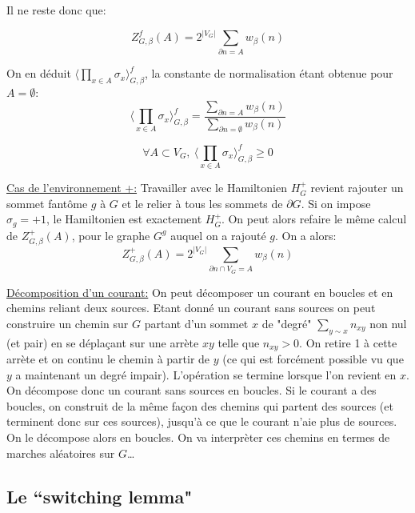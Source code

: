 \documentclass[a4paper,12pt]{report}
\begin{document}
Il ne reste donc que:
\begin{prop}
$$
Z_{G,\beta}^f(A) = 2^{\vert V_G \vert} \sum_{\partial n  = A} w_{\beta}(n)
$$
\end{prop}

On en déduit $\langle \prod_{x \in A} \sigma_x \rangle_{G,\beta}^f$, la constante de normalisation étant obtenue pour $A = \emptyset$:
$$
\langle \prod_{x \in A} \sigma_x \rangle_{G,\beta}^f = \frac{\sum_{\partial n = A} w_{\beta}(n)}{\sum_{\partial n = \emptyset} w_{\beta}(n)}
$$

\begin{prop}
$$
\forall A \subset V_G, \ \langle \prod_{x \in A} \sigma_x \rangle_{G,\beta}^f \geq 0
$$
\end{prop}

\underline{Cas de l'environnement +:}
Travailler avec le Hamiltonien $H_{G}^+$ revient rajouter un sommet fantôme $g$ à $G$ et le relier à tous les sommets de $\partial G$. Si on impose $\sigma_g = +1$, le Hamiltonien est exactement $H_{G}^+$. On peut alors refaire le même calcul de $Z_{G,\beta}^+(A)$, pour le graphe $G^g$ auquel on a rajouté $g$. On a alors:
$$
Z_{G,\beta}^+(A) = 2^{\vert V_G \vert} \sum_{\partial n \cap V_G  = A} w_{\beta}(n)
$$

\underline{Décomposition d'un courant:} On peut décomposer un courant en boucles et en chemins reliant deux sources. Etant donné un courant sans sources on peut construire un chemin sur $G$ partant d'un sommet $x$ de "degré" $\sum_{y \sim x} n_{xy}$ non nul (et pair) en se déplaçant sur une arrète $xy$ telle que $n_{xy}>0$. On retire 1 à cette arrète et on continu le chemin à partir de $y$ (ce qui est forcément possible vu que $y$ a maintenant un degré impair). L'opération se termine lorsque l'on revient en $x$. On décompose donc un courant sans sources en boucles. Si le courant a des boucles, on construit de la même façon des chemins qui partent des sources (et terminent donc sur ces sources), jusqu'à ce que le courant n'aie plus de sources. On le décompose alors en boucles. On va interprèter ces chemins en termes de marches aléatoires sur $G$\dots

\subsection{Le ``switching lemma"}
\end{document}
